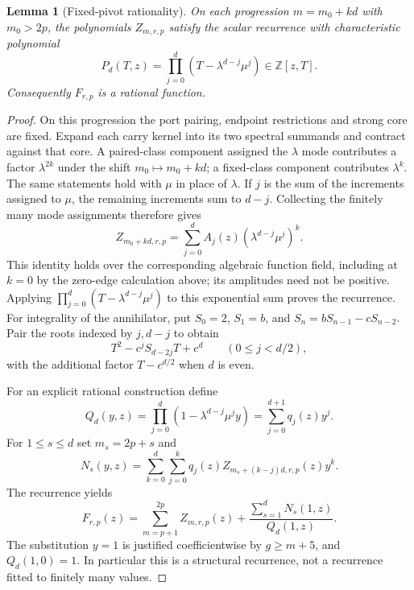 \documentclass[11pt]{amsart}
\newtheorem{lemma}[theorem]{Lemma}
\theoremstyle{definition}
\theoremstyle{remark}
\numberwithin{equation}{section}
\begin{document}
\begin{lemma}[Fixed-pivot rationality]\label{raw:rationality}
On each progression $m=m_0+kd$ with $m_0>2p$, the polynomials
$Z_{m,r,p}$ satisfy the scalar recurrence with characteristic polynomial
\[
 P_d(T,z)=\prod_{j=0}^d(T-\lambda^{d-j}\mu^j)\in\mathbb Z[z,T].
\]
Consequently $F_{r,p}$ is a rational function.
\end{lemma}
\begin{proof}
On this progression the port pairing, endpoint restrictions and strong
core are fixed.  Expand each carry kernel into its two spectral
summands and contract against that core.  A paired-class component
assigned the $\lambda$ mode contributes a factor $\lambda^{2k}$ under
the shift $m_0\mapsto m_0+kd$; a fixed-class component contributes
$\lambda^k$.  The same statements hold with $\mu$ in place of $\lambda$.
If $j$ is the sum of the increments assigned to $\mu$, the remaining
increments sum to $d-j$.  Collecting the finitely many mode assignments
therefore gives
\[
 Z_{m_0+kd,r,p}=\sum_{j=0}^d A_j(z)(\lambda^{d-j}\mu^j)^k.
\]
This identity holds over the corresponding algebraic function field,
including at $k=0$ by the zero-edge calculation above; its amplitudes
need not be positive.  Applying $\prod_{j=0}^d(T-\lambda^{d-j}\mu^j)$
to this exponential sum proves the recurrence.
For integrality of the annihilator, put
$S_0=2$, $S_1=b$, and $S_n=bS_{n-1}-cS_{n-2}$.
Pair the roots indexed by $j,d-j$ to obtain
\[
 T^2-c^jS_{d-2j}T+c^d\qquad(0\le j<d/2),
\]
with the additional factor $T-c^{d/2}$ when $d$ is even.

For an explicit rational construction define
\[
 Q_d(y,z)=\prod_{j=0}^d(1-\lambda^{d-j}\mu^j y)
          =\sum_{j=0}^{d+1}q_j(z)y^j.
\]
For $1\le s\le d$ set $m_s=2p+s$ and
\[
 N_s(y,z)=\sum_{k=0}^d\sum_{j=0}^k
              q_j(z)Z_{m_s+(k-j)d,r,p}(z)y^k.
\]
The recurrence yields
\begin{equation}\label{raw:initial-data}
 F_{r,p}(z)=\sum_{m=p+1}^{2p}Z_{m,r,p}(z)
              +\frac{\sum_{s=1}^dN_s(1,z)}{Q_d(1,z)}.
\end{equation}
The substitution $y=1$ is justified coefficientwise by $g\ge m+5$,
and $Q_d(1,0)=1$.  In particular this is a structural recurrence,
not a recurrence fitted to finitely many values.
\end{proof}
\end{document}
